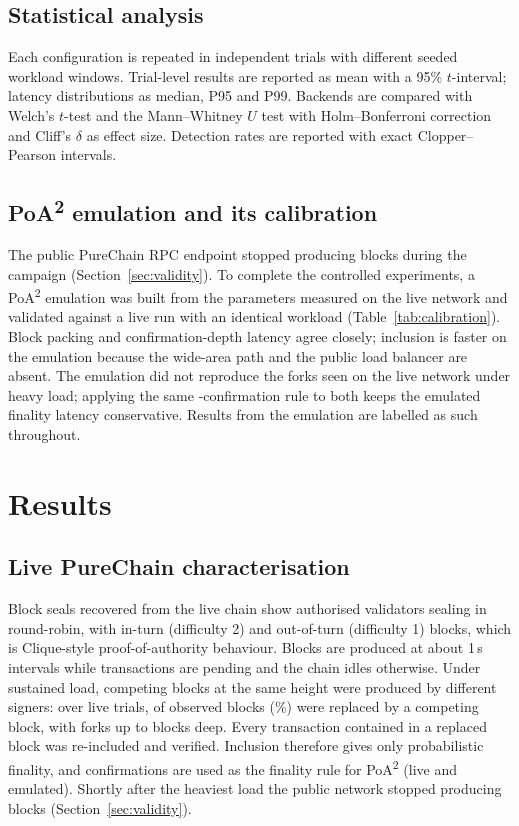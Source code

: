 \documentclass[10pt]{article}
\newcommand{\poa}{PoA\textsuperscript{2}}
\begin{document}
\subsection{Statistical analysis}
Each configuration is repeated in independent trials with different seeded workload windows. Trial-level results are
reported as mean with a 95\% $t$-interval; latency distributions as median, P95 and P99. Backends are compared with
Welch's $t$-test and the Mann--Whitney $U$ test with Holm--Bonferroni correction and Cliff's $\delta$ as effect size.
Detection rates are reported with exact Clopper--Pearson intervals.

\subsection{\poa{} emulation and its calibration}\label{sec:emulation}
The public PureChain RPC endpoint stopped producing blocks during the campaign (Section~\ref{sec:validity}). To
complete the controlled experiments, a \poa{} emulation was built from the parameters measured on the live network and
validated against a live run with an identical workload (Table~\ref{tab:calibration}). Block packing and
confirmation-depth latency agree closely; inclusion is faster on the emulation because the wide-area path and the
public load balancer are absent. The emulation did not reproduce the forks seen on the live network under heavy load;
applying the same \FinalityDepth-confirmation rule to both keeps the emulated finality latency conservative. Results
from the emulation are labelled as such throughout.


\section{Results}\label{sec:results}


\subsection{Live PureChain characterisation}\label{sec:live}
Block seals recovered from the live chain show \LiveValidators{} authorised validators sealing in round-robin, with
in-turn (difficulty 2) and out-of-turn (difficulty 1) blocks, which is Clique-style proof-of-authority behaviour. Blocks
are produced at about 1\,s intervals while transactions are pending and the chain idles otherwise. Under sustained
load, competing blocks at the same height were produced by different signers: over \LiveRuns{} live trials,
\LiveReorgBlocks{} of \LiveBlocksObserved{} observed blocks (\LiveReorgPct\%) were replaced by a competing block, with
forks up to \LiveMaxReorg{} blocks deep. Every transaction contained in a replaced block was re-included and verified.
Inclusion therefore gives only probabilistic finality, and \FinalityDepth{} confirmations are used as the finality
rule for \poa{} (live and emulated). Shortly after the heaviest load the public network stopped producing blocks
(Section~\ref{sec:validity}).

\end{document}
